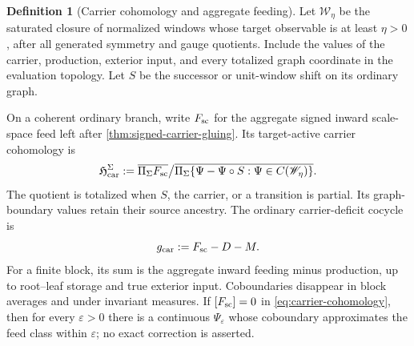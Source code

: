 \documentclass[11pt]{article}
\numberwithin{section}{part}
\theoremstyle{plain}
\theoremstyle{definition}
\newtheorem{definition}[definition]{Definition}
\theoremstyle{remark}
\begin{document}
\begin{definition}[Carrier cohomology and aggregate feeding]
\label{def:carrier-cohomology}
Let \(\mathscr W_\eta\) be the saturated closure of normalized windows whose
target observable is at least \(\eta>0\), after all generated symmetry and
gauge quotients.  Include the values of the carrier, production, exterior
input, and every totalized graph coordinate in the evaluation topology.
Let \(S\) be the successor or unit-window shift on its ordinary graph.

On a coherent ordinary branch, write \(F_{\rm sc}\) for the aggregate signed
inward scale-space feed left after \cref{thm:signed-carrier-gluing}.  Its
target-active carrier cohomology is
\begin{equation}
 \label{eq:carrier-cohomology}
 \mathfrak H_{\rm car}^{\Sigma}
 :=\overline{\Pi_\Sigma F_{\rm sc}}
 \big/
 \overline{\Pi_\Sigma\{\Psi-\Psi\circ S:\Psi\in C(\mathscr W_\eta)\}}.
\end{equation}
The quotient is totalized when \(S\), the carrier, or a transition is partial.
Its graph-boundary values retain their source ancestry.  The ordinary
carrier-deficit cocycle is
\begin{equation}
 \label{eq:carrier-excess-cocycle}
 g_{\rm car}
 :=F_{\rm sc}-D-M.
\end{equation}
For a finite block, its sum is the aggregate inward feeding minus production,
up to root--leaf storage and true exterior input.  Coboundaries disappear in
block averages and under invariant measures.  If
\([F_{\rm sc}]=0\) in \eqref{eq:carrier-cohomology}, then for every
\(\varepsilon>0\) there is a continuous \(\Psi_\varepsilon\) whose coboundary
approximates the feed class within \(\varepsilon\); no exact correction is
asserted.
\end{definition}
\end{document}
